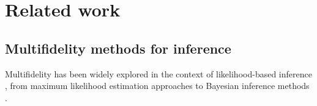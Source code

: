 \section{Related work}




\subsection{Multifidelity methods for inference} %



Multifidelity has been widely explored in the context of likelihood-based inference \cite{peherstorfer_survey_2018}, from maximum likelihood estimation approaches \cite{maurais_multifidelity_2023} to Bayesian inference methods \cite{vo_bayesian_2019, catanach_bayesian_2020}.

